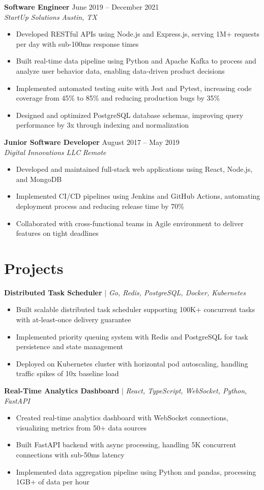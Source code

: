 \documentclass[11pt,letterpaper]{article}
\newcommand{\jobheader}[4]{
  \textbf{#1} \hfill #2 \\
  \textit{#3} \hfill \textit{#4}
  \vspace{-5pt}
}
\newcommand{\projectheader}[2]{
  \textbf{#1} $|$ \textit{#2}
  \vspace{-5pt}
}
\begin{document}
\jobheader{Software Engineer}{June 2019 -- December 2021}{StartUp Solutions}{Austin, TX}
\begin{itemize}
  \item Developed RESTful APIs using Node.js and Express.js, serving 1M+ requests per day with sub-100ms response times
  \item Built real-time data pipeline using Python and Apache Kafka to process and analyze user behavior data, enabling data-driven product decisions
  \item Implemented automated testing suite with Jest and Pytest, increasing code coverage from 45\% to 85\% and reducing production bugs by 35\%
  \item Designed and optimized PostgreSQL database schemas, improving query performance by 3x through indexing and normalization
\end{itemize}

\jobheader{Junior Software Developer}{August 2017 -- May 2019}{Digital Innovations LLC}{Remote}
\begin{itemize}
  \item Developed and maintained full-stack web applications using React, Node.js, and MongoDB
  \item Implemented CI/CD pipelines using Jenkins and GitHub Actions, automating deployment process and reducing release time by 70\%
  \item Collaborated with cross-functional teams in Agile environment to deliver features on tight deadlines
\end{itemize}

\section*{Projects}

\projectheader{Distributed Task Scheduler}{Go, Redis, PostgreSQL, Docker, Kubernetes}
\begin{itemize}
  \item Built scalable distributed task scheduler supporting 100K+ concurrent tasks with at-least-once delivery guarantee
  \item Implemented priority queuing system with Redis and PostgreSQL for task persistence and state management
  \item Deployed on Kubernetes cluster with horizontal pod autoscaling, handling traffic spikes of 10x baseline load
\end{itemize}

\projectheader{Real-Time Analytics Dashboard}{React, TypeScript, WebSocket, Python, FastAPI}
\begin{itemize}
  \item Created real-time analytics dashboard with WebSocket connections, visualizing metrics from 50+ data sources
  \item Built FastAPI backend with async processing, handling 5K concurrent connections with sub-50ms latency
  \item Implemented data aggregation pipeline using Python and pandas, processing 1GB+ of data per hour
\end{itemize}
\end{document}
